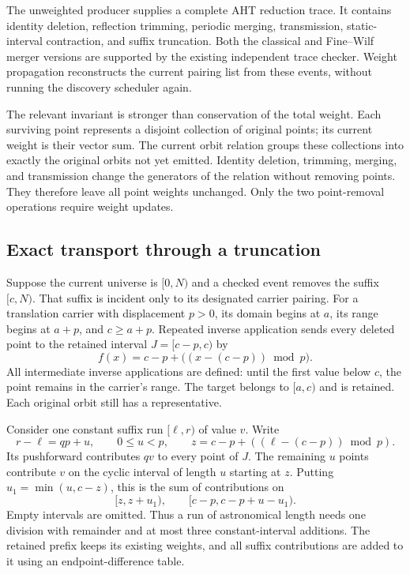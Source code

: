 The unweighted producer supplies a complete AHT reduction trace. It contains
identity deletion, reflection trimming, periodic merging, transmission,
static-interval contraction, and suffix truncation. Both the classical and
Fine--Wilf merger versions are supported by the existing independent trace
checker. Weight propagation reconstructs the current pairing list from these
events, without running the discovery scheduler again.

The relevant invariant is stronger than conservation of the total weight.
Each surviving point represents a disjoint collection of original points;
its current weight is their vector sum. The current orbit relation groups
these collections into exactly the original orbits not yet emitted. Identity
deletion, trimming, merging, and transmission change the generators of the
relation without removing points. They therefore leave all point weights
unchanged. Only the two point-removal operations require weight updates.

\subsection{Exact transport through a truncation}

Suppose the current universe is $[0,N)$ and a checked event removes the suffix
$[c,N)$. That suffix is incident only to its designated carrier pairing.
For a translation carrier with displacement $p>0$, its domain begins at $a$,
its range begins at $a+p$, and $c\ge a+p$. Repeated inverse application sends
every deleted point to the retained interval $J=[c-p,c)$ by
\begin{equation}
 f(x)=c-p+\bigl((x-(c-p))\bmod p\bigr).
 \label{eq:weighted-residue-map}
\end{equation}
All intermediate inverse applications are defined: until the first value
below $c$, the point remains in the carrier's range. The target belongs to
$[a,c)$ and is retained. Each original orbit still has a representative.

Consider one constant suffix run $[\ell,r)$ of value $v$. Write
\[
 r-\ell=qp+u,\qquad 0\le u<p,
 \qquad z=c-p+((\ell-(c-p))\bmod p).
\]
Its pushforward contributes $qv$ to every point of $J$. The remaining $u$
points contribute $v$ on the cyclic interval of length $u$ starting at $z$.
Putting $u_1=\min(u,c-z)$, this is the sum of contributions on
\[
 [z,z+u_1),\qquad [c-p,c-p+u-u_1).
\]
Empty intervals are omitted. Thus a run of astronomical length needs one
division with remainder and at most three constant-interval additions. The
retained prefix keeps its existing weights, and all suffix contributions
are added to it using an endpoint-difference table.

